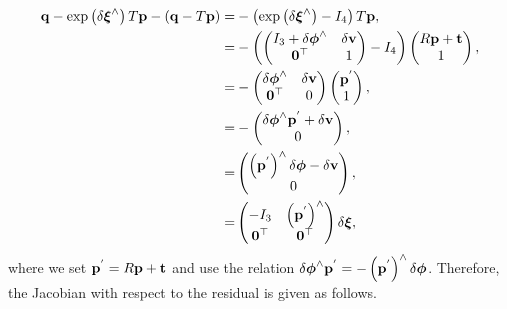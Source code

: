 \begin{align}
  \begin{split}
    {\bf q} - \exp \left( \delta \boldsymbol \xi^{\wedge} \right) T {\bf p} - \left( {\bf q} - T {\bf p} \right)
    = & - \left( \exp \left( \delta \boldsymbol \xi^{\wedge} \right) - I_{4} \right) T {\bf p}, \\
    = & - \left( \left( \begin{matrix} I_{3} + \delta \boldsymbol \phi^{\wedge} & \delta {\bf v} \\ {\bf 0}^{\top} & 1 \end{matrix} \right) - I_{4} \right) \left( \begin{matrix} R {\bf p} + {\bf t} \\ 1 \end{matrix} \right), \\
    = & - \left( \begin{matrix} \delta \boldsymbol \phi^{\wedge} & \delta {\bf v} \\ {\bf 0}^{\top} & 0 \end{matrix} \right) \left( \begin{matrix} {\bf p}^{'} \\ 1 \end{matrix} \right), \\
     = & - \left( \begin{matrix} \delta \boldsymbol \phi^{\wedge} {\bf p}^{'} + \delta {\bf v} \\ 0 \end{matrix} \right), \\
     = & \left( \begin{matrix} \left( {\bf p}^{'} \right)^{\wedge} \delta \boldsymbol \phi - \delta {\bf v} \\ 0 \end{matrix} \right), \\
     = & \left( \begin{matrix} -I_{3} & \left( {\bf p}^{'} \right)^{\wedge} \\ {\bf 0}^{\top} & {\bf 0}^{\top} \end{matrix} \right) \delta \boldsymbol \xi,
  \end{split}
\end{align}
%
where we set ${\bf p}^{'} = R{\bf p} + {\bf t}$ and use the relation $\delta \boldsymbol{\phi}^{\wedge} {\bf p}^{'} = -\left( {\bf p}^{'} \right)^{\wedge} \delta \boldsymbol{\phi}$.
Therefore, the Jacobian with respect to the residual is given as follows.
%
